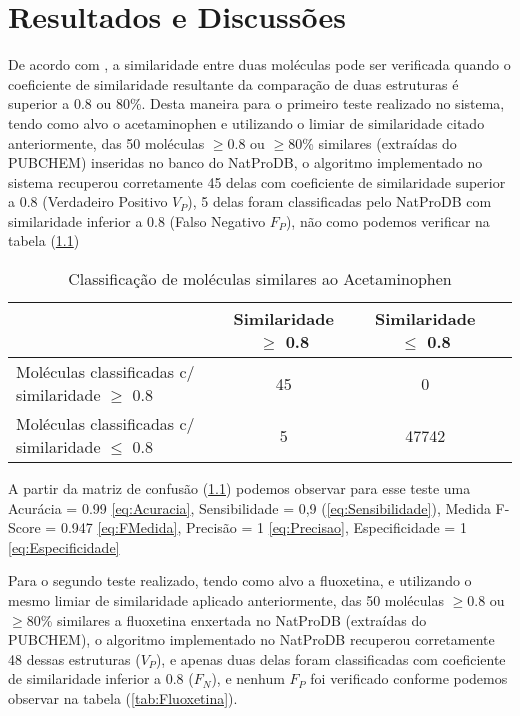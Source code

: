 \chapter{Resultados e Discussões}
\label{chap:resul}
 
 De acordo com , a similaridade entre duas moléculas pode ser verificada quando o coeficiente de similaridade resultante da comparação de duas estruturas é superior a 0.8 ou 80\%. Desta maneira para o primeiro teste realizado no sistema, tendo como alvo o acetaminophen e utilizando o limiar de similaridade citado anteriormente, das 50 moléculas $\geq $0.8 ou $\geq $80\% similares (extraídas do PUBCHEM) inseridas no banco do NatProDB, o algoritmo implementado no sistema recuperou corretamente 45 delas com coeficiente de similaridade superior a 0.8 (Verdadeiro Positivo $V_P$), 5 delas foram classificadas pelo NatProDB com similaridade inferior a 0.8 (Falso Negativo $F_P$), não  como podemos verificar na tabela (\ref{tab:Acetaminophen}) 
 
 \begin{table}[!htb]
	\centering
	\footnotesize
	\caption[Classificação de moléculas similares ao Acetaminophen]{Classificação de moléculas similares ao Acetaminophen}
	\label{tab:Acetaminophen}	
	\begin{tabular}{p{4cm}ccc}
		\hline \SPACE
		\textbf{}&\textbf{Similaridade $\geq $ 0.8} & \textbf{Similaridade $\leq $ 0.8} \\ \hline \SPACE
	Moléculas classificadas c/ similaridade $\geq $ 0.8  &	45 & 0 \\ \hline \SPACE
	Moléculas classificadas c/ similaridade $\leq $ 0.8  & 5 & 47742\\ \hline 
	\end{tabular}
\end{table}
A partir da matriz de confusão (\ref{tab:Acetaminophen}) podemos observar para esse teste uma Acurácia = 0.99 \eqref{eq:Acuracia}, Sensibilidade = 0,9 (\ref{eq:Sensibilidade}), Medida F-Score = 0.947 \eqref{eq:FMedida}, Precisão = 1 \eqref{eq:Precisao}, Especificidade = 1 \eqref{eq:Especificidade}

Para o segundo teste realizado, tendo como alvo a fluoxetina, e utilizando o mesmo limiar de similaridade aplicado anteriormente, das 50 moléculas $\geq $0.8 ou $\geq $80\% similares a fluoxetina enxertada no NatProDB (extraídas do PUBCHEM), o algoritmo implementado no NatProDB recuperou corretamente 48 dessas estruturas ($V_P$), e apenas duas delas foram classificadas com coeficiente de similaridade inferior a 0.8 ($F_N$), e nenhum $F_P$ foi verificado conforme podemos observar na tabela (\ref{tab:Fluoxetina}). 

